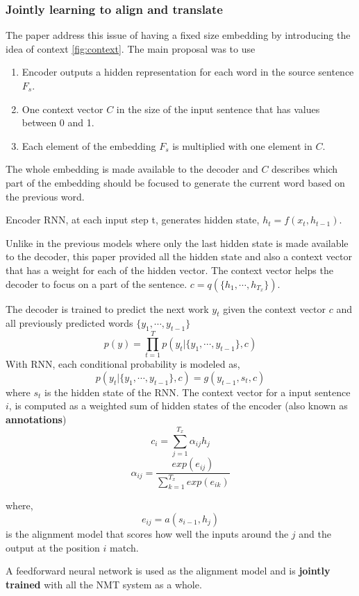 \documentclass[conference]{IEEEtran}
\begin{document}
\subsubsection{Jointly learning to align and translate}
The paper \cite{bahdanau2014neural} address this issue of having a fixed size embedding by introducing the idea of context \ref{fig:context}. The main proposal was to use
\begin{enumerate}
 \item Encoder outputs a hidden representation for each word in the source sentence $F_s$.
 \item One context vector $C$ in the size of the input sentence that has values between 0 and 1.
 \item Each element of the embedding $F_s$ is multiplied with one element in $C$.
\end{enumerate}
The whole embedding is made available to the decoder and $C$ describes which part of the embedding should be focused to generate the current word based on the previous word.

Encoder RNN, at each input step t, generates hidden state, $h_t = f(x_t, h_{t-1})$.

Unlike in the previous models where only the last hidden state is made available to the decoder, this paper provided all the hidden state and also a context vector that has a weight for each of the hidden vector. The context vector helps the decoder to focus on a part of the sentence. $c = q(\{h_1,\cdots,h_{T_x}\})$. 

The decoder is trained to predict the next work $y_t$ given the context vector $c$ and all previously predicted words $\{ y_1, \cdots, y_{t-1}\}$
 $$ p(y) = \prod^{T}_{t=1} p(y_t | \{ y_1, \cdots, y_{t-1}\} ,c ) $$
 With RNN, each conditional probability is modeled as,
 $$ p(y_t | \{ y_1, \cdots, y_{t-1}\}, c) = g(y_{t-1}, s_t, c) $$ where $s_t$ is the hidden state of the RNN.
 The context vector for a input sentence $i$, is computed as a weighted sum of hidden states of the encoder (also known as \textbf{annotations})
  $$ c_i = \sum_{j=1}^{T_{x}} \alpha_{ij} h_j$$
  $$ \alpha_{ij} = \frac{ exp(e_{ij})}{ \sum_{k=1}^{T_x} exp (e_{ik})}$$

where,
$$ e_{ij} = a(s_{i-1}, h_j)  $$ is the alignment model that scores how well the inputs around the $j$ and the output at the position $i$ match.

A feedforward neural network is used as the alignment model and is \textbf{jointly trained} with all the NMT system as a whole.
\end{document}
